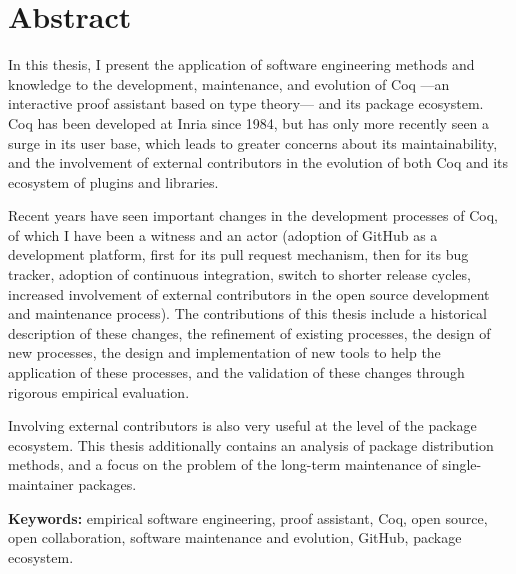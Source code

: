 \begin{minipage}[t][0.5\textheight][t]{\textwidth}
    
\section*{Abstract}
\begin{SingleSpace}

In this thesis, I present the application of software engineering methods and knowledge to the development, maintenance, and evolution of Coq ---an interactive proof assistant based on type theory--- and its package ecosystem.
Coq has been developed at Inria since 1984, but has only more recently seen a surge in its user base, which leads to greater concerns about its maintainability, and the involvement of external contributors in the evolution of both Coq and its ecosystem of plugins and libraries.

Recent years have seen important changes in the development processes of Coq, of which I have been a witness and an actor (adoption of GitHub as a development platform, first for its pull request mechanism, then for its bug tracker, adoption of continuous integration, switch to shorter release cycles, increased involvement of external contributors in the open source development and maintenance process).
The contributions of this thesis include a historical description of these changes, the refinement of existing processes, the design of new processes, the design and implementation of new tools to help the application of these processes, and the validation of these changes through rigorous empirical evaluation.

Involving external contributors is also very useful at the level of the package ecosystem.
This thesis additionally contains an analysis of package distribution methods, and a focus on the problem of the long-term maintenance of single-maintainer packages.
\end{SingleSpace}

\vspace{3mm}

\textbf{Keywords:} empirical software engineering, proof assistant, Coq, open source, open collaboration, software maintenance and evolution, GitHub, package ecosystem.

\end{minipage} \\
    
